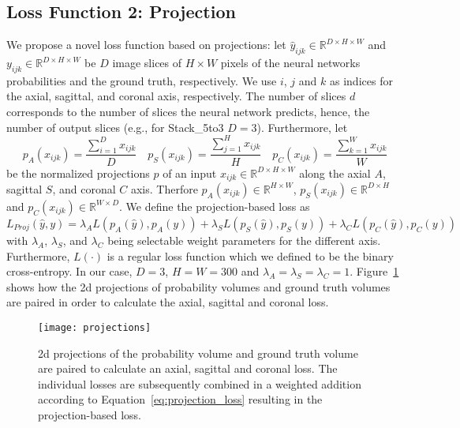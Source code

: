 \subsection{Loss Function 2: Projection} \label{sec:train_loss_proj}
We propose a novel loss function based on projections: let $\hat{y}_{ijk} \in \mathbb{R}^{D \times H \times W}$ and $y_{ijk} \in \mathbb{R}^{D \times H \times W}$ be $D$ image slices of $H \times W$ pixels of the neural networks probabilities and the ground truth, respectively. We use $i$, $j$ and $k$ as indices for the axial, sagittal, and coronal axis, respectively. The number of slices $d$ corresponds to the number of slices the neural network predicts, hence, the number of output slices (e.g., for Stack\_5to3 $D=3$). Furthermore, let
\begin{equation}
   p_{A}(x_{ijk}) = \frac{\sum_{i=1}^{D} x_{ijk}}{D}
   \quad
   p_{S}(x_{ijk}) = \frac{\sum_{j=1}^{H} x_{ijk}}{H}
   \quad
   p_{C}(x_{ijk}) = \frac{\sum_{k=1}^{W} x_{ijk}}{W}
   \label{eq:projections}
\end{equation}
be the normalized projections $p$ of an input $x_{ijk} \in \mathbb{R}^{D \times H \times W}$ along the axial $A$, sagittal $S$, and coronal $C$ axis. Therfore $p_{A}(x_{ijk}) \in \mathbb{R}^{H \times W}$, $p_{S}(x_{ijk}) \in \mathbb{R}^{D \times H}$ and $p_{C}(x_{ijk}) \in \mathbb{R}^{W \times D}$. We define the projection-based loss as
\begin{equation}
   L_{Proj}(\hat{y}, y) = \lambda_{A}L(p_{A}(\hat{y}), p_{A}(y)) + \lambda_{S}L(p_{S}(\hat{y}), p_{S}(y)) + \lambda_{C}L(p_{C}(\hat{y}), p_{C}(y))
   \label{eq:projection_loss}
\end{equation}
with $\lambda_{A}$, $\lambda_{S}$, and $\lambda_{C}$ being selectable weight parameters for the different axis. Furthermore, $L(\cdot)$ is a regular loss function which we defined to be the binary cross-entropy. In our case, $D = 3$, $H = W = 300$ and $\lambda_{A} = \lambda_{S} = \lambda_{C} = 1$. Figure~\ref{fig:projections} shows how the \gls{2d} projections of probability volumes and ground truth volumes are paired in order to calculate the axial, sagittal and coronal loss.

\begin{figure}[htbp]	
	\texttt{[image: projections]}
    \caption[Projection-based Loss]{\gls{2d} projections of the probability volume and ground truth volume are paired to calculate an axial, sagittal and coronal loss. The individual losses are subsequently combined in a weighted addition according to Equation~\ref{eq:projection_loss} resulting in the projection-based loss.}
    \label{fig:projections}
\end{figure}

